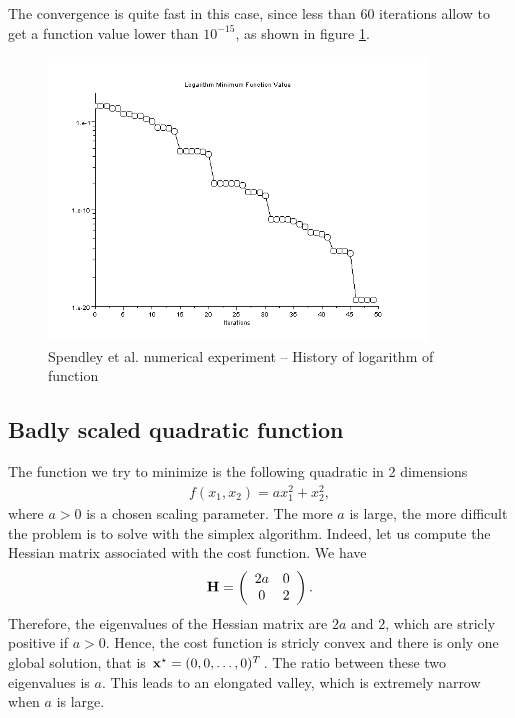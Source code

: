 The convergence is quite fast in this case, since less than 60 iterations
allow to get a function value lower than $10^{-15}$, as shown in 
figure \ref{fig-spendley-numexp1-logfopt}.

\begin{figure}
\begin{center}
\includegraphics[width=10cm]{quad2bis-spendley-history-logfopt.png}
\end{center}
\caption{Spendley et al. numerical experiment -- History of logarithm of function}
\label{fig-spendley-numexp1-logfopt}
\end{figure}

\subsection{Badly scaled quadratic function}

The function we try to minimize is the following quadratic 
in 2 dimensions 
\begin{eqnarray}
\label{quadratic-sp-function2}
f(x_1,x_2) = a x_1^2 + x_2^2,
\end{eqnarray}
where $a>0$ is a chosen scaling parameter. 
The more $a$ is large, the more difficult the problem is 
to solve with the simplex algorithm.
Indeed, let us compute the Hessian matrix associated with the 
cost function. We have 
\begin{eqnarray}
\mathbf{H} = \left(
\begin{array}{cc}
2 a & 0 \\
0 & 2
\end{array}
\right).
\end{eqnarray}
Therefore, the eigenvalues of the Hessian matrix 
are $2a$ and $2$, which are stricly 
positive if $a>0$. Hence, the cost function is stricly convex and 
there is only one global solution, that is $\mathbf{x}^\star = (0,0,\ldots,0)^T$.
The ratio between these two eigenvalues is $a$. This leads 
to an elongated valley, which is extremely narrow when $a$ is large.

